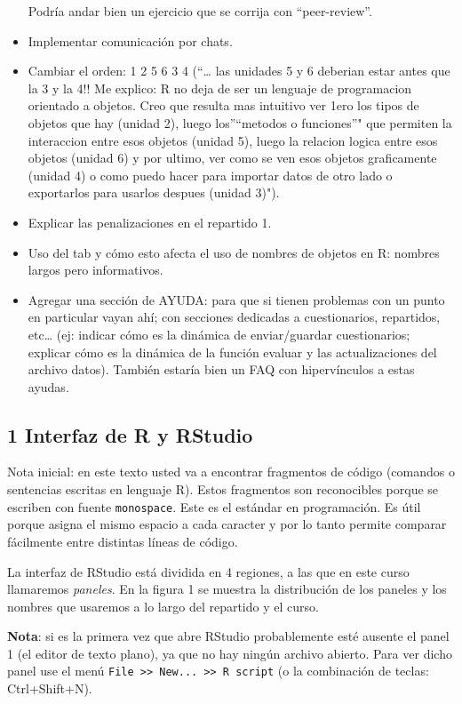 \documentclass[]{article}
\begin{document}
\begin{itemize}
  Podría andar bien un ejercicio que se corrija con ``peer-review''.
\item
  Implementar comunicación por chats.
\item
  Cambiar el orden: 1 2 5 6 3 4 (``\ldots{} las unidades 5 y 6 deberian
  estar antes que la 3 y la 4!! Me explico: R no deja de ser un lenguaje
  de programacion orientado a objetos. Creo que resulta mas intuitivo
  ver 1ero los tipos de objetos que hay (unidad 2), luego los''``metodos
  o funciones''" que permiten la interaccion entre esos objetos (unidad
  5), luego la relacion logica entre esos objetos (unidad 6) y por
  ultimo, ver como se ven esos objetos graficamente (unidad 4) o como
  puedo hacer para importar datos de otro lado o exportarlos para
  usarlos despues (unidad 3)").
\item
  Explicar las penalizaciones en el repartido 1.
\item
  Uso del tab y cómo esto afecta el uso de nombres de objetos en R:
  nombres largos pero informativos.
\item
  Agregar una sección de AYUDA: para que si tienen problemas con un
  punto en particular vayan ahí; con secciones dedicadas a
  cuestionarios, repartidos, etc\ldots{} (ej: indicar cómo es la
  dinámica de enviar/guardar cuestionarios; explicar cómo es la dinámica
  de la función evaluar y las actualizaciones del archivo datos).
  También estaría bien un FAQ con hipervínculos a estas ayudas.
\end{itemize}
\subsection{1 Interfaz de R y RStudio}

Nota inicial: en este texto usted va a encontrar fragmentos de código
(comandos o sentencias escritas en lenguaje R). Estos fragmentos son
reconocibles porque se escriben con fuente \texttt{monospace}. Este es
el estándar en programación. Es útil porque asigna el mismo espacio a
cada caracter y por lo tanto permite comparar fácilmente entre distintas
líneas de código.

La interfaz de RStudio está dividida en 4 regiones, a las que en este
curso llamaremos \emph{paneles}. En la figura 1 se muestra la
distribución de los paneles y los nombres que usaremos a lo largo del
repartido y el curso.

\textbf{Nota}: si es la primera vez que abre RStudio probablemente esté
ausente el panel 1 (el editor de texto plano), ya que no hay ningún
archivo abierto. Para ver dicho panel use el menú
\texttt{File \textgreater{}\textgreater{} New... \textgreater{}\textgreater{} R script}
(o la combinación de teclas: Ctrl+Shift+N).
\end{document}
